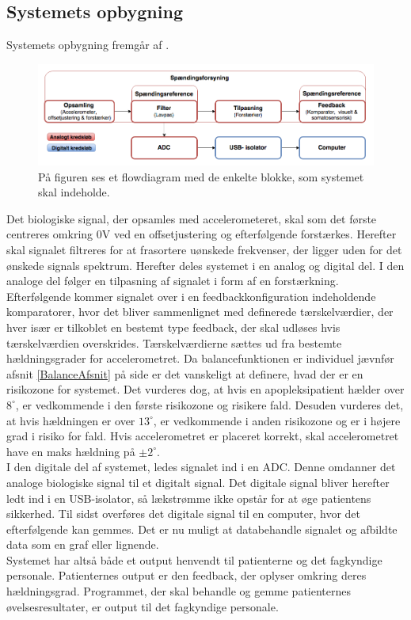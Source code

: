 \subsection{Systemets opbygning}\label{ref:blokdiagram}
Systemets opbygning fremgår af .

\begin{figure}[H]
	\centering
	\includegraphics[scale=0.7]{figures/cProblemloesning/blokdiagram.PNG}
	\caption{På figuren ses et flowdiagram med de enkelte blokke, som systemet skal indeholde.}
	\label{kravblok}
\end{figure}
Det biologiske signal, der opsamles med accelerometeret, skal som det første centreres omkring $0$V ved en offsetjustering og efterfølgende forstærkes. Herefter skal signalet filtreres for at frasortere uønskede frekvenser, der ligger uden for det ønskede signals spektrum. Herefter deles systemet i en analog og digital del. I den analoge del følger en tilpasning af signalet i form af en forstærkning. Efterfølgende kommer signalet over i en feedbackkonfiguration indeholdende komparatorer, hvor det bliver sammenlignet med definerede tærskelværdier, der hver især er tilkoblet en bestemt type feedback, der skal udløses hvis tærskelværdien overskrides. Tærskelværdierne sættes ud fra bestemte hældningsgrader for accelerometret. Da balancefunktionen er individuel jævnfør afsnit \ref{BalanceAfsnit} på side \pageref{BalanceAfsnit} er det vanskeligt at definere, hvad der er en risikozone for systemet. Det vurderes dog, at hvis en apopleksipatient hælder over $8^{\circ}$, er vedkommende i den første risikozone og risikere fald. Desuden vurderes det, at hvis hældningen er over $13^{\circ}$, er vedkommende i anden risikozone og er i højere grad i risiko for fald. Hvis accelerometret er placeret korrekt, skal accelerometret have en maks hældning på $\pm2^{\circ}$. \\
I den digitale del af systemet, ledes signalet ind i en ADC. Denne omdanner det analoge biologiske signal til et digitalt signal. Det digitale signal bliver herefter ledt ind i en USB-isolator, så lækstrømme ikke opstår for at øge patientens sikkerhed. Til sidst overføres det digitale signal til en computer, hvor det efterfølgende kan gemmes. Det er nu muligt at databehandle signalet og afbildte data som en graf eller lignende. \\
Systemet har altså både et output henvendt til patienterne og det fagkyndige personale. Patienternes output er den feedback, der oplyser omkring deres hældningsgrad. Programmet, der skal behandle og gemme patienternes øvelsesresultater, er output til det fagkyndige personale.


